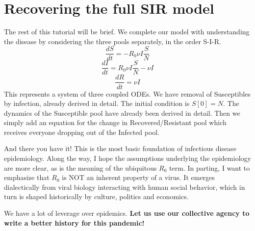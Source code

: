 \documentclass[]{article}
\begin{document}
\section{Recovering the full SIR
model}\label{recovering-the-full-sir-model}

The rest of this tutorial will be brief. We complete our model with
understanding the disease by considering the three pools separately, in
the order S-I-R. \[\tag {12} \frac {dS}{dt} = - R_0 \nu I \frac{S}{N} \]
\[\tag {13} \frac {dI}{dt} = R_0 \nu I \frac{S}{N} - \nu I \]
\[\tag {14} \frac {dR}{dt} = \nu I \] This represents a system of three
coupled ODEs. We have removal of Susceptibles by infection, already
derived in detail. The initial condition is \(S[0] = N\). The dynamics
of the Susceptible pool have already been derived in detail. Then we
simply add an equation for the change in Recovered/Resistant pool which
receives everyone dropping out of the Infected pool.

And there you have it! This is the most basic foundation of infectious
disease epidemiology. Along the way, I hope the assumptions underlying
the epidemiology are more clear, as is the meaning of the ubiquitous
\(R_0\) term. In parting, I want to emphasize that \(R_0\) is NOT an
inherent property of a virus. It emerges dialectically from viral
biology interacting with human social behavior, which in turn is shaped
historically by culture, politics and economics.

We have a lot of leverage over epidemics. \textbf{Let us use our
collective agency to write a better history for this pandemic!}
\end{document}
